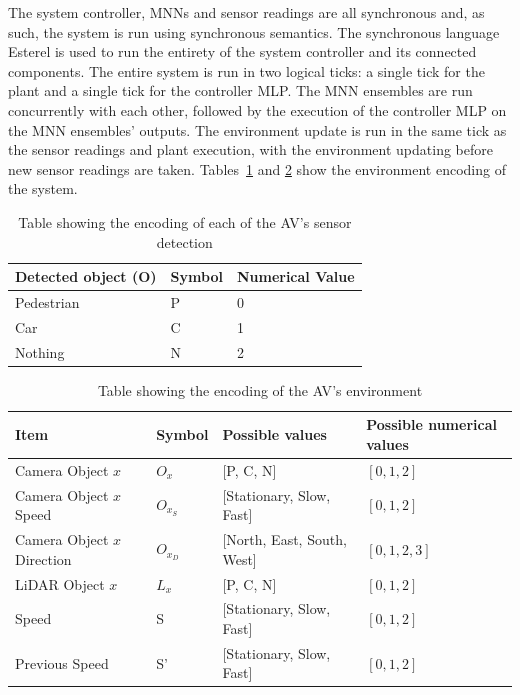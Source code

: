 The system controller, \acp{MNN} and sensor readings are all synchronous and, as such, the system is run using synchronous semantics.
The synchronous language Esterel is used to run the entirety of the system controller and its connected components.
The entire system is run in two logical ticks: a single tick for the plant and a single tick for the controller \ac{MLP}.
The \ac{MNN} ensembles are run concurrently with each other, followed by the execution of the controller \ac{MLP} on the \ac{MNN} ensembles' outputs.
The environment update is run in the same tick as the sensor readings and plant execution, with the environment updating before new sensor readings are taken.
Tables~\ref{table:objects} and \ref{table:encoding} show the environment encoding of the system.

\begin{table}[h]
	\centering
	\caption{Table showing the encoding of each of the \ac{AV}'s sensor detection}
	\label{table:objects}
	\begin{tabular}{@{}|l|l|l|@{}}
		\hline
		Detected object (O) & Symbol & Numerical Value \\ \hline
		Pedestrian & P & 0 \\
		Car & C & 1 \\
		Nothing & N & 2 \\
		\hline
	\end{tabular}
\end{table}

\begin{table}[h]
	\centering
	\caption{Table showing the encoding of the \ac{AV}'s environment}
	\label{table:encoding}
	\begin{tabular}{|p{}|p{}|p{}|p{}|}
		\hline
		Item & Symbol & Possible values & Possible numerical values \\ \hline
		Camera Object $x$ & $O_x$ & [P, C, N] & $[0, 1, 2]$ \\
		Camera Object $x$ Speed & $O_{x_S}$ & [Stationary, Slow, Fast] & $[0, 1, 2]$ \\
		Camera Object $x$ Direction & $O_{x_D}$ & [North, East, South, West] & $[0, 1, 2, 3]$ \\
		LiDAR Object $x$ & $L_x$ & [P, C, N] & $[0, 1, 2]$ \\
		Speed & S & [Stationary, Slow, Fast] & $[0, 1, 2]$ \\
		Previous Speed & S' & [Stationary, Slow, Fast] & $[0, 1, 2]$ \\
		\hline
	\end{tabular}
\end{table}

